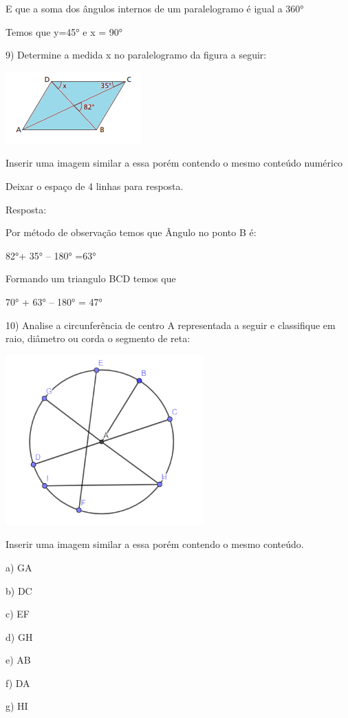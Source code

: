 E que a soma dos ângulos internos de um paralelogramo é igual a 360°

Temos que y=45° e x = 90°

9) Determine a medida x no paralelogramo da figura a seguir:

\includegraphics[width=2.05208in,height=1.09375in]{./imgSAEB_8_MAT/media/image11.png}

Inserir uma imagem similar a essa porém contendo o mesmo conteúdo
numérico

Deixar o espaço de 4 linhas para resposta.

Resposta:

Por método de observação temos que Ângulo no ponto B é:

82°+ 35° -- 180° =63°

Formando um triangulo BCD temos que

70° + 63° -- 180° = 47°

10) Analise a circunferência de centro A representada a seguir e
classifique em raio, diâmetro ou corda o segmento de reta:

\includegraphics[width=2.98681in,height=2.57292in]{./imgSAEB_8_MAT/media/image12.png}

Inserir uma imagem similar a essa porém contendo o mesmo conteúdo.

a) GA

b) DC

c) EF

d) GH

e) AB

f) DA

g) HI

